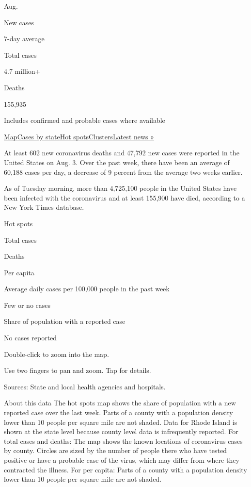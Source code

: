 Aug.

New cases

7-day average

Total cases

4.7 million+

Deaths

155,935

Includes confirmed and probable cases where available

\protect\hyperlink{map}{Map}\protect\hyperlink{states}{Cases by
state}\protect\hyperlink{hotspots}{Hot
spots}\protect\hyperlink{clusters}{Clusters}\href{https://www.nytimes.com/2020/08/03/world/coronavirus-covid-19.html}{Latest
news »}

At least 602 new coronavirus deaths and 47,792 new cases were reported
in the United States on Aug. 3. Over the past week, there have been an
average of 60,188 cases per day, a decrease of 9 percent from the
average two weeks earlier.

As of Tuesday morning, more than 4,725,100 people in the United States
have been infected with the coronavirus and at least 155,900 have died,
according to a New York Times database.

Hot spots

Total cases

Deaths

Per capita

Average daily cases per 100,000 people in the past week

Few or no cases

Share of population with a reported case

No cases reported

Double-click to zoom into the map.

Use two fingers to pan and zoom. Tap for details.

Sources: State and local health agencies and hospitals.

About this data The hot spots map shows the share of population with a
new reported case over the last week. Parts of a county with a
population density lower than 10 people per square mile are not shaded.
Data for Rhode Island is shown at the state level because county level
data is infrequently reported. For total cases and deaths: The map shows
the known locations of coronavirus cases by county. Circles are sized by
the number of people there who have tested positive or have a probable
case of the virus, which may differ from where they contracted the
illness. For per capita: Parts of a county with a population density
lower than 10 people per square mile are not shaded.


